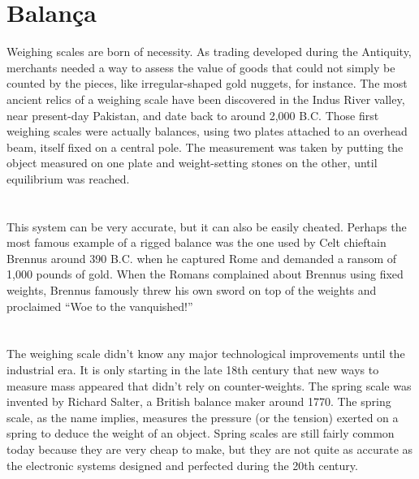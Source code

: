 \chapter{Balança}
Weighing scales are born of necessity. As trading developed during the Antiquity, merchants needed a way to assess the value of goods that could not simply be counted by the pieces, like irregular-shaped gold nuggets, for instance. The most ancient relics of a weighing scale have been discovered in the Indus River valley, near present-day Pakistan, and date back to around 2,000 B.C. Those first weighing scales were actually balances, using two plates attached to an overhead beam, itself fixed on a central pole. The measurement was taken by putting the object measured on one plate and weight-setting stones on the other, until equilibrium was reached.
\\
\\
\\
This system can be very accurate, but it can also be easily cheated. Perhaps the most famous example of a rigged balance was the one used by Celt chieftain Brennus around 390 B.C. when he captured Rome and demanded a ransom of 1,000 pounds of gold. When the Romans complained about Brennus using fixed weights, Brennus famously threw his own sword on top of the weights and proclaimed “Woe to the vanquished!”
\\
\\
\\
The weighing scale didn’t know any major technological improvements until the industrial era. It is only starting in the late 18th century that new ways to measure mass appeared that didn’t rely on counter-weights. The spring scale was invented by Richard Salter, a British balance maker around 1770. The spring scale, as the name implies, measures the pressure (or the tension) exerted on a spring to deduce the weight of an object. Spring scales are still fairly common today because they are very cheap to make, but they are not quite as accurate as the electronic systems designed and perfected during the 20th century.
\\
\\
\\

